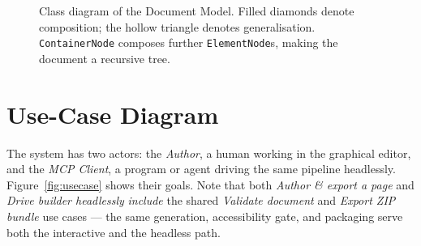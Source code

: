\begin{figure}[p]
{%
  }
  \caption{Class diagram of the Document Model. Filled diamonds denote composition; the hollow triangle denotes generalisation. \texttt{ContainerNode} composes further \texttt{ElementNode}s, making the document a recursive tree.}
  \label{fig:class}
\end{figure}

\section{Use-Case Diagram}
The system has two actors: the \emph{Author}, a human working in the graphical
editor, and the \emph{MCP Client}, a program or agent driving the same pipeline
headlessly. Figure~\ref{fig:usecase} shows their goals. Note that both
\emph{Author \& export a page} and \emph{Drive builder headlessly} \emph{include}
the shared \emph{Validate document} and \emph{Export ZIP bundle} use cases --- the
same generation, accessibility gate, and packaging serve both the interactive and
the headless path.

